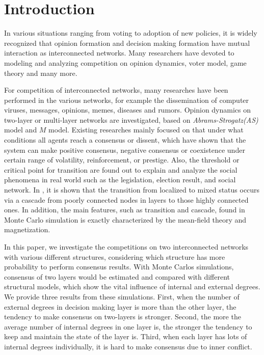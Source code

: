 \documentclass[english]{cccconf}
\begin{document}
\section{Introduction}
In various situations ranging from voting to adoption of new policies, it is widely recognized that opinion formation and decision making formation have mutual interaction as interconnected networks\cite{bianconi2018,domenico2013,tomasini2015, kimsangwoo2012,newman2010,boccaletti2014,mikko2013,huberman2004}. Many researchers have devoted to modeling and analyzing competition on opinion dynamics\cite{amato2017,quattrociocchi2014,haibo2017, hua2014}, voter model\cite{redner2017}, game theory\cite{smyrnakis2019} and many more\cite{danziger2019,namkhanhvu2017,laguna2004,masuda2015,zuev2012, shenyu2018}.  
 
For competition of interconnected networks, many researches have been performed in the various networks, for example the dissemination of computer viruses, messages, opinions, memes, diseases and rumors\cite{hua2014,shenyu2018,alvarez2016,gomez2015,diep2017,rocca2014,velasquez2018}. Opinion dynamics on two-layer or multi-layer networks are investigated, based on \textit{Abrams-Strogatz(AS)} model\cite{abrams2003,vazquez2010} and $M$ model\cite{rocca2014}. Existing researches mainly focused on that under what conditions all agents reach a consensus or dissent, which have shown that the system can make positive consensus, negative consensus or coexistence under certain range of volatility, reinforcement, or prestige. Also, the threshold or critical point for transition are found out to explain and analyze the social phenomena in real world such as the legislation, election result, and social network\cite{alvarez2016, amato2017, diep2017}. In \cite{gomez2015}, it is shown that the transition from localized to mixed status occurs via a cascade from poorly connected nodes in layers to those highly connected ones. In addition, the main features, such as transition and cascade, found in Monte Carlo simulation is exactly characterized by the mean-field theory and magnetization\cite{alvarez2016, diep2017, amato2017, gomez2015}.   

In this paper, we investigate the competitions on two interconnected networks with various different structures, considering which structure has more probability to perform consensus results. With Monte Carlos simulations, consensus of two layers would be estimated and compared with different structural models, which show the vital influence of internal and external degrees. We provide three results from these simulations. First, when the number of external degrees in decision making layer is more than the other layer, the tendency to make consensus on two-layers is stronger. Second, the more the average number of internal degrees in one layer is, the stronger the tendency to keep and maintain the state of the layer is. Third, when each layer has lots of internal degrees individually, it is hard to make consensus due to inner conflict.    
\end{document}
